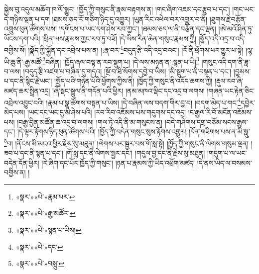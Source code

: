 སྐྱེས་བུ་འདུལ་མཆོག་ཁ་ལོ་སྒྱུར། །ཁྱོད་ཀྱི་གསུང་ནི་རྣམ་བརྟགས་ན། །གང་ཞིག་འཇམ་དང་རྩུབ་པ་དང་། །གང་ཡང་དེ་གཉིས་ལྡན་པ་དག །ཐམས་ཅད་རོ་གཅིག་ཉིད་དུ་འགྱུར། །ཡུན་རིང་འཕེལ་བར་འགྱུར་བ་ནི། །ཐུགས་རྗེ་བརྩོན་འགྲུས་ཕུན་ཚོགས་པས། །དགོངས་པ་ཡང་དག་ཤེས་རབ་ཀྱང་། །ཐམས་ཅད་ལ་ནི་བརྩོན་དང་ལྡན། །ཨེ་མའོ་ཤིན་ཏུ་ཡོངས་དག་པའི། །ཕྲིན་ལས་རྣམས་ཀྱང་རབ་ཏུ་བཟོ། །དེ་ཡིས་རིན་ཆེན་གསུང་རྣམས་ཀྱི། །སྣོད་འདི་འདྲ་བ་འདི་བགྱིས་སོ། །སྣོད་ཀྱི་སྐྱོན་དང་འབྲེལ་པས་ན། །:རྣ་བར་\footnote{«སྣར་»«པེ་»རྣམ་པར་}བདུད་རྩི་འདི་འདྲ་བའང་། །རོ་ནི་ཕྲོགས་པར་གྱུར་པ་སྟེ། །ལྷ་ཡི་ཆུ་ནི་:རྒྱ་མཚོ་\footnote{«སྣར་»«པེ་»རྒྱ་མཚོར་}བཞིན། །ཁྱོད་ཞལ་བལྟ་ན་རབ་སྡུག་པ། །དེ་ལས་མཉན་ན་:སྙན་པ་ཡི།\footnote{«སྣར་»«པེ་»སྙན་པ་ཡིས།} །གསུང་འདི་དག་ནི་ཟླ་བ་ལས། །བདུད་རྩི་འཛག་པ་བཞིན་དུ་གདའ། །སྔོ་བ་ཐི་སོགས་དབྱེ་བ་ཡིས། །མི་སྡུག་པ་ནི་བསྟན་པ་དང་། །བྱམས་པ་དང་ནི་སྙིང་རྗེ་ཡང་། །སྤྱོད་པའི་གཉེན་པོའི་ཕྱོགས་ཀྱིས་ནི། །ཁྱོད་ཀྱི་གསུང་ནི་འདོད་ཆགས་ཀྱི། །རྡུལ་རབ་ཞི་མཛད་ཆར་སྤྲིན་འདྲ། །ཞེ་སྡང་སྦྲུལ་ནི་གདོན་པའི་ཕྱིར། །ནམ་མཁའ་ལྡིང་དང་འདྲ་བ་ལགས། །གཞན་ཡང་རྟེན་ཅིང་འབྲེལ་འབྱུང་བའི། །རྣམ་པ་སྣ་ཚོགས་བསྟན་པ་ཡིས། །དེ་བཞིན་ལས་བདག་གིར་བྱ་བ། །བདག་མེད་པ་གང་\footnote{«སྣར་»«པེ་»དང་}དབྱེར་མེད་པས། །ཡང་དང་ཡང་དུ་མི་ཤེས་པའི། །རབ་རིབ་འཇོམས་པས་གདུགས་དང་འདྲ། །ང་རྒྱལ་རི་བོ་མངོན་འཇོམས་པས། །བརྒྱ་བྱིན་མཚོན་ཆ་འདྲ་བ་ལགས། །གལ་ཏེ་འདི་ནི་མ་གསུངས་ན། །བདེ་གཤེགས་དགྲ་བཅོམ་སངས་རྒྱས་དང་། །དེ་ལྟར་རྟོགས་ཉིད་ཕུན་ཚོགས་པའི། །ཁྱོད་ཀྱི་བདེན་གསུང་སུས་རྟོགས་འགྱུར། །དོན་གཟིགས་པས་ན་མི་སླུ་\footnote{«སྣར་»«པེ་»བསླུ་}བ། །ནོངས་མི་མངའ་ཕྱིར་རྗེས་སུ་མཐུན། །ལེགས་པར་སྦྱར་བས་གོ་སླ་སྟེ། །ཁྱོད་ཀྱི་གསུང་ནི་ལེགས་གསུམ་ལྡན། །ཟབ་པ་དང་ནི་སྙན་པ་དང་། །གོ་སླ་དང་ནི་ལེགས་སྦྱར་དང་། །གདུལ་བྱ་དང་ནི་རྗེས་སུ་མཐུན། །གདུག་པ་ལ་ཡང་བདེན་དོན་ཕྱིར། །རེ་ཞིག་དང་པོར་ཁྱོད་ཀྱི་གསུང་། །ཉན་པ་རྣམས་ཀྱི་ཡིད་འཕྲོག་མཛད། །དེ་ནས་ཡིད་ལ་བསམས་བགྱིས་ན། །
